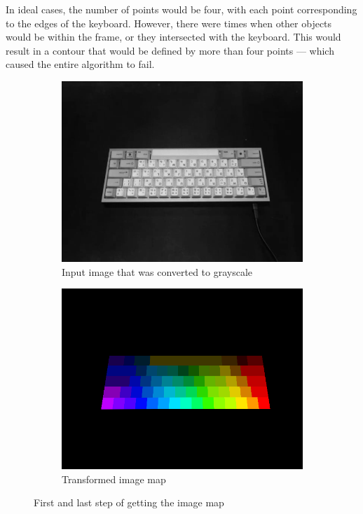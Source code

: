 \documentclass[preprint,12pt,authoryear]{elsarticle}
\begin{document}
In ideal cases, the number of points would be four, with each point
corresponding to the edges of the keyboard. However, there were times when other
objects would be within the frame, or they intersected with the keyboard. This
would result in a contour that would be defined by more than four points ---
which caused the entire algorithm to fail.

\begin{figure}[h]
	\centering
	\begin{subfigure}{.50\textwidth}
		\centering
		\includegraphics[width=.995\linewidth]{grayscale.png}
		\caption{Input image that was converted to grayscale}
	\end{subfigure}%
	\begin{subfigure}{.50\textwidth}
		\centering
		\includegraphics[width=.995\linewidth]{transformed-image-map.png}
		\caption{Transformed image map}
	\end{subfigure}%
	\caption{First and last step of getting the image map}
	\label{fig:metho-image-map}
\end{figure}
\end{document}
